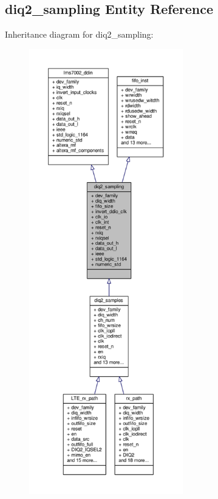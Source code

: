 \subsection{diq2\+\_\+sampling Entity Reference}
\label{classdiq2__sampling}


Inheritance diagram for diq2\+\_\+sampling\+:\nopagebreak
\begin{figure}[H]
\begin{center}
\leavevmode
\includegraphics[height=550pt]{d9/db3/classdiq2__sampling__inherit__graph}
\end{center}
\end{figure}


